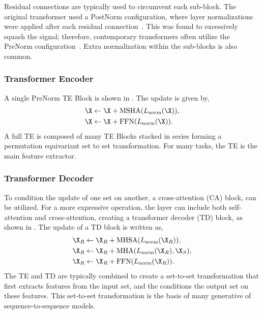 Residual connections are typically used to circumvent each sub-block.
The original transformer used a PostNorm configuration, where layer normalizations were applied after each residual connection~\cite{Attention}.
This was found to excessively squash the signal; therefore, contemporary transformers often utilize the PreNorm configuration~\cite{PreLN}.
Extra normalization within the sub-blocks is also common.

\subsubsection{Transformer Encoder}

A single PreNorm TE Block is shown in .
The update is given by,
\begin{equation}
\begin{aligned}
    \X & \leftarrow \X + \text{MSHA}(L_\text{norm}(\X)), \\
    \X & \leftarrow \X + \text{FFN}(L_\text{norm}(\X)).
\end{aligned}
\end{equation}
A full TE is composed of many TE Blocks stacked in series forming a permutation equivariant set to set transformation.
For many tasks, the TE is the main feature extractor.

\subsubsection{Transformer Decoder}

To condition the update of one set on another, a cross-attention (CA) block, can be utilized.
For a more expressive operation, the layer can include both self-attention and cross-attention, creating a transformer decoder (TD) block, as shown in .
The update of a TD block is written as,
\begin{equation}
\begin{aligned}
    \X_R & \leftarrow \X_R + \text{MHSA}(L_\text{norm}(\X_R)), \\
    \X_R & \leftarrow \X_R + \text{MHA}(L_\text{norm}(\X_R), \X_S), \\
    \X_R & \leftarrow \X_R + \text{FFN}(L_\text{norm}(\X_R)).
\end{aligned}
\end{equation}
The TE and TD are typically combined to create a set-to-set transformation that first extracts features from the input set, and the conditions the output set on these features.
This set-to-set transformation is the basis of many generative of sequence-to-sequence models.

